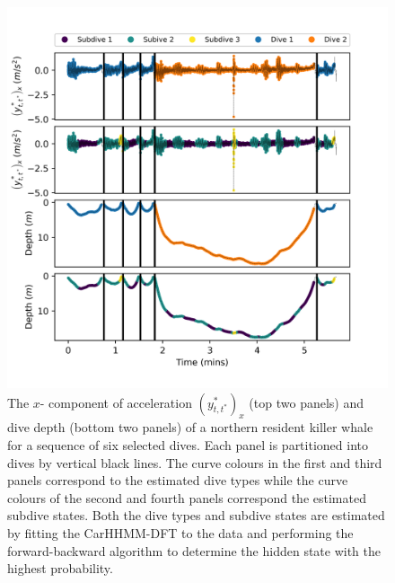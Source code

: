 \begin{figure}[ht]
	\centering
	\includegraphics[width=4.75in]{../Plots/2019/20190902-182840-CATs_OB_1_0_267_CarHHMM2_decoded_dives.png}
	\caption{The $x$- component of acceleration $(y^*_{t,t^*})_x$ (top two panels) and dive depth (bottom two panels) of a northern resident killer whale for a sequence of six selected dives. Each panel is partitioned into dives by vertical black lines. The curve colours in the first and third panels correspond to the estimated dive types while the curve colours of the second and fourth panels correspond the estimated subdive states. Both the dive types and subdive states are estimated by fitting the CarHHMM-DFT to the data and performing the forward-backward algorithm to determine the hidden state with the highest probability.}
	\label{fig:labeled_dives}
\end{figure}


